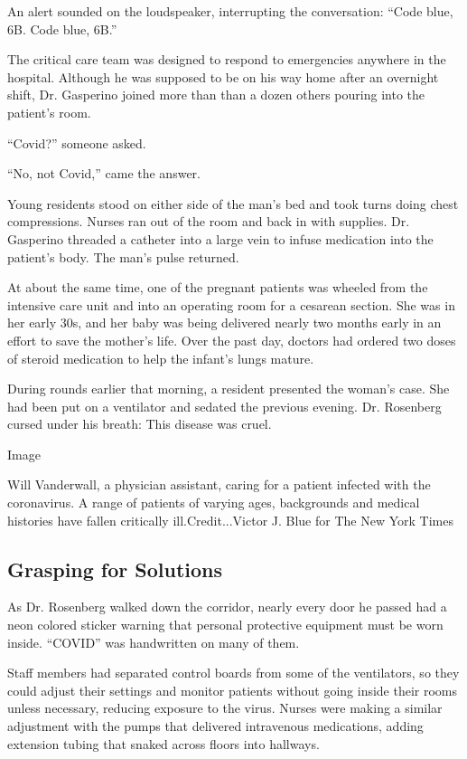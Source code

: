 An alert sounded on the loudspeaker, interrupting the conversation:
``Code blue, 6B. Code blue, 6B.''

The critical care team was designed to respond to emergencies anywhere
in the hospital. Although he was supposed to be on his way home after an
overnight shift, Dr. Gasperino joined more than than a dozen others
pouring into the patient's room.

``Covid?'' someone asked.

``No, not Covid,'' came the answer.

Young residents stood on either side of the man's bed and took turns
doing chest compressions. Nurses ran out of the room and back in with
supplies. Dr. Gasperino threaded a catheter into a large vein to infuse
medication into the patient's body. The man's pulse returned.

At about the same time, one of the pregnant patients was wheeled from
the intensive care unit and into an operating room for a cesarean
section. She was in her early 30s, and her baby was being delivered
nearly two months early in an effort to save the mother's life. Over the
past day, doctors had ordered two doses of steroid medication to help
the infant's lungs mature.

During rounds earlier that morning, a resident presented the woman's
case. She had been put on a ventilator and sedated the previous evening.
Dr. Rosenberg cursed under his breath: This disease was cruel.

Image

Will Vanderwall, a physician assistant, caring for a patient infected
with the coronavirus. A range of patients of varying ages, backgrounds
and medical histories have fallen critically ill.Credit...Victor J. Blue
for The New York Times

\hypertarget{grasping-for-solutions}{%
\subsection{Grasping for Solutions}\label{grasping-for-solutions}}

As Dr. Rosenberg walked down the corridor, nearly every door he passed
had a neon colored sticker warning that personal protective equipment
must be worn inside. ``COVID'' was handwritten on many of them.

Staff members had separated control boards from some of the ventilators,
so they could adjust their settings and monitor patients without going
inside their rooms unless necessary, reducing exposure to the virus.
Nurses were making a similar adjustment with the pumps that delivered
intravenous medications, adding extension tubing that snaked across
floors into hallways.

